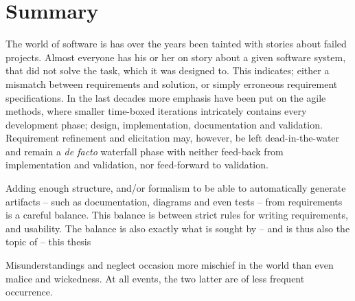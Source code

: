 \chapter{Summary}
The world of software is has over the years been tainted with stories about failed projects. Almost everyone has his or her on story about a given software system, that did not solve the task, which it was designed to. This indicates; either a mismatch between requirements and solution, or simply erroneous requirement specifications. In the last decades more emphasis have been put on the agile methods, where smaller time-boxed iterations intricately contains every development phase; design, implementation, documentation and validation. Requirement refinement and elicitation may, however, be left dead-in-the-water and remain a \emph{de facto} waterfall phase with neither feed-back from implementation and validation, nor feed-forward to validation.\bigskip

\noindent Adding enough structure, and/or formalism to be able to automatically generate artifacts -- such as documentation, diagrams and even tests -- from requirements is a careful balance. This balance is between strict rules for writing requirements, and usability. The balance is also exactly what is sought by -- and is thus also the topic of --  this thesis
\newpage
\begin{fquote}Misunderstandings and neglect occasion more mischief in the world than even malice and wickedness. At all events, the two latter are of less frequent occurrence.
\end{fquote}